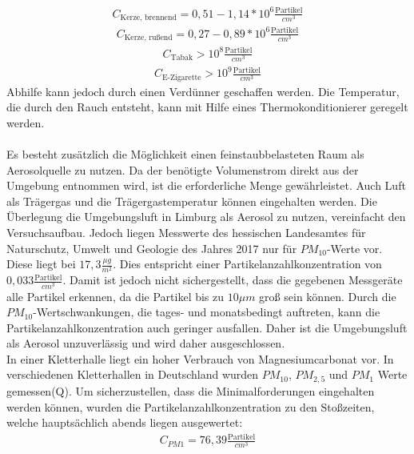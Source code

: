 \begin{align*}
C_\text{Kerze, brennend} = 0,51 - 1,14 * 10^6 \frac{\text{Partikel}}{cm^3}
\end{align*}
\begin{align*}
C_\text{Kerze, ru{\ss}end} = 0,27 - 0,89 * 10^6 \frac{\text{Partikel}}{cm^3}
\end{align*}
\begin{align*}
C_\text{Tabak} > 10^8 \frac{\text{Partikel}}{cm^3}
\end{align*}
\begin{align*}
C_\text{E-Zigarette} > 10^9 \frac{\text{Partikel}}{cm^3}
\end{align*}
Abhilfe kann jedoch durch einen Verd\"{u}nner geschaffen werden. Die Temperatur, die durch den Rauch entsteht, kann mit Hilfe eines Thermokonditionierer geregelt werden.
\\\\
Es besteht zus\"{a}tzlich die M\"{o}glichkeit einen feinstaubbelasteten Raum als Aerosolquelle zu nutzen. Da der ben\"{o}tigte Volumenstrom direkt aus der Umgebung entnommen wird, ist die erforderliche Menge gew\"{a}hrleistet. Auch Luft als Tr\"{a}gergas und die Tr\"{a}gergastemperatur k\"{o}nnen eingehalten werden. Die \"{U}berlegung die Umgebungsluft in Limburg als Aerosol zu nutzen, vereinfacht den Versuchsaufbau. Jedoch liegen Messwerte des hessischen Landesamtes f\"{u}r Naturschutz, Umwelt und Geologie des Jahres 2017 nur f\"{u}r \(PM_{10}\)-Werte vor. Diese liegt bei \(17,3 \frac{\mu g}{m^2}\). Dies entspricht einer Partikelanzahlkonzentration von \(0,033 \frac{\text{Partikel}}{cm^3}\). Damit ist jedoch nicht sichergestellt, dass die gegebenen Messger\"{a}te alle Partikel erkennen, da die Partikel bis zu \(10 \mu m\) gro{\ss} sein k\"{o}nnen. Durch die \(PM_{10}\)-Wertschwankungen, die tages- und monatsbedingt auftreten, kann die Partikelanzahlkonzentration auch geringer ausfallen. Daher ist die Umgebungsluft als Aerosol unzuverl\"{a}ssig und wird daher ausgeschlossen.\\
In einer Kletterhalle liegt ein hoher Verbrauch von Magnesiumcarbonat vor. In verschiedenen Kletterhallen in Deutschland wurden \(PM_{10}\), \(PM_{2,5}\) und \(PM_1\) Werte gemessen(Q). Um sicherzustellen, dass die Minimalforderungen eingehalten werden k\"{o}nnen, wurden die Partikelanzahlkonzentration zu den Sto{\ss}zeiten, welche haupts\"{a}chlich abends liegen ausgewertet:
\begin{align*}
C_{PM 1} = 76,39 \frac{\text{Partikel}}{cm^3}
\end{align*}
